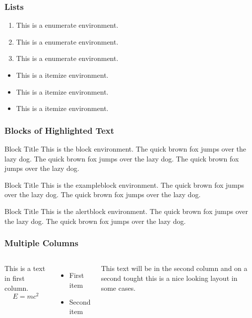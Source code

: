 \documentclass[compress]{beamer}
\numberwithin{figure}{section}
\numberwithin{table}{section}
\numberwithin{equation}{section}
\numberwithin{figure}{section}
\numberwithin{table}{section}
\numberwithin{equation}{section}
\begin{document}

\begin{frame}
\frametitle{Lists}

\begin{enumerate}
  \item This is a enumerate environment.
  \item This is a enumerate environment.
  \item This is a enumerate environment.
\end{enumerate}

\vspace{2ex}
\begin{itemize}[<+-| alert@+>]
\item This is a itemize environment.
\item This is a itemize environment.
\item This is a itemize environment.
\end{itemize}
\end{frame}


\begin{frame}
\frametitle{Blocks of Highlighted Text}
\begin{block}{Block Title}
This is the block environment. The quick brown fox jumps over the lazy dog. The quick brown fox jumps over the lazy dog. The quick brown fox jumps over the lazy dog.
\end{block}

\begin{exampleblock}{Block Title}
This is the exampleblock environment. The quick brown fox jumps over the lazy dog. The quick brown fox jumps over the lazy dog.
\end{exampleblock}

\begin{alertblock}{Block Title}
This is the alertblock environment. The quick brown fox jumps over the lazy dog. The quick brown fox jumps over the lazy dog.
\end{alertblock}
\end{frame}


\begin{frame}
\frametitle{Multiple Columns}
\begin{columns}[c] %

This is a text in first column.
$$E=mc^2$$
\begin{itemize}
\item First item
\item Second item
\end{itemize}

This text will be in the second column
and on a second tought this is a nice looking
layout in some cases.

\end{columns}
\end{frame}
\end{document}
